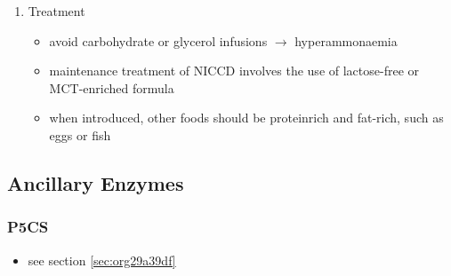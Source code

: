\documentclass{scrartcl}
\begin{document}
\begin{enumerate}
\item Treatment
\label{sec:org91070ee}
\begin{itemize}
\item avoid carbohydrate or glycerol infusions \(\to\) hyperammonaemia
\item maintenance treatment of NICCD involves the use of lactose-free or
MCT-enriched formula
\item when introduced, other foods should be proteinrich and fat-rich,
such as eggs or fish
\end{itemize}
\end{enumerate}
\subsection{Ancillary Enzymes}
\label{sec:org388f44f}
\subsubsection{P5CS}
\label{sec:orgd0ee7a7}
\begin{itemize}
\item see section \ref{sec:org29a39df}
\end{itemize}
\end{document}
